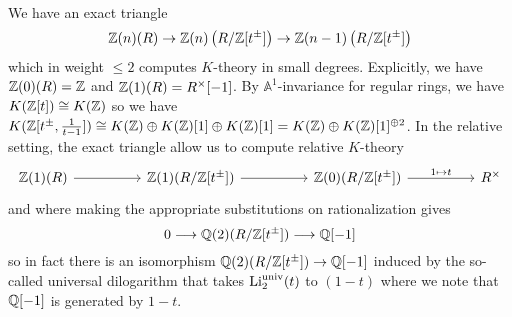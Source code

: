 We have an exact triangle
$$\mathbb{Z}(n)(R)\to\mathbb{Z}(n)\left(R/\mathbb{Z}[t^{\pm}]\right)\to\mathbb{Z}(n-1)\left(R/\mathbb{Z}[t^{\pm}]\right)$$
which in weight $\leq 2$ computes $K$-theory in small degrees. Explicitly, we have $\mathbb{Z}(0)(R)=\mathbb{Z}$ and $\mathbb{Z}(1)(R)=R^{\times}[-1]$. By $\mathbb{A}^{1}$-invariance for regular rings, we have $K(\mathbb{Z}[t])\cong K(\mathbb{Z})$ so we have $K(\mathbb{Z}[t^{\pm},\frac{1}{t-1}])\cong K(\mathbb{Z})\oplus K(\mathbb{Z})[1]\oplus K(\mathbb{Z})[1]= K(\mathbb{Z})\oplus K(\mathbb{Z})[1]^{\oplus 2}$. In the relative setting, the exact triangle allow us to compute relative $K$-theory 
$$%
\begin{tikzcd}
	{\ZZ(1)(R)} && {\ZZ(1)(R/\ZZ[t^{\pm}])} && {\ZZ(0)(R/\ZZ[t^{\pm}])} && {R^{\times}}
	\arrow[from=1-1, to=1-3]
	\arrow[from=1-3, to=1-5]
	\arrow["{1\mapsto t}", from=1-5, to=1-7]
\end{tikzcd}$$
and where making the appropriate substitutions on rationalization gives 
$$0\longrightarrow \mathbb{Q}(2)(R/\mathbb{Z}[t^{\pm}])\longrightarrow \mathbb{Q}[-1]$$
so in fact there is an isomorphism $\mathbb{Q}(2)(R/\mathbb{Z}[t^{\pm}])\to \mathbb{Q}[-1]$ induced by the so-called universal dilogarithm that takes $\mathrm{Li}_{2}^{\mathrm{univ}}(t)$ to $(1-t)$ where we note that $\mathbb{Q}[-1]$ is generated by $1-t$. 

